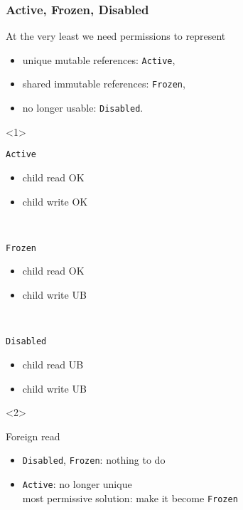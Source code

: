 \begin{frame}[t]
    \frametitle{Active, Frozen, Disabled}
    At the very least we need permissions to represent
    \begin{itemize}
        \item unique mutable references: \texttt{Active},
        \item shared immutable references: \texttt{Frozen},
        \item no longer usable: \texttt{Disabled}.
    \end{itemize}

    \begin{onlyenv}<1>
        \begin{minipage}{0.3\textwidth}
            \begin{block}{\texttt{Active}}
                \begin{itemize}
                    \item child read OK
                    \item child write OK
                \end{itemize}
            \end{block}
        \end{minipage}
        ~
        \begin{minipage}{0.3\textwidth}
            \begin{block}{\texttt{Frozen}}
                \begin{itemize}
                    \item child read OK
                    \item child write UB
                \end{itemize}
            \end{block}
        \end{minipage}
        ~
        \begin{minipage}{0.3\textwidth}
            \begin{block}{\texttt{Disabled}}
                \begin{itemize}
                    \item child read UB
                    \item child write UB
                \end{itemize}
            \end{block}
        \end{minipage}
    \end{onlyenv}

    \begin{onlyenv}<2>
        \begin{block}{Foreign read}
            \begin{itemize}
                \item \texttt{Disabled}, \texttt{Frozen}: nothing to do
                \item \texttt{Active}: no longer unique\\
                      most permissive solution: make it become \texttt{Frozen}
            \end{itemize}
        \end{block}


\end{onlyenv}
\end{frame}
